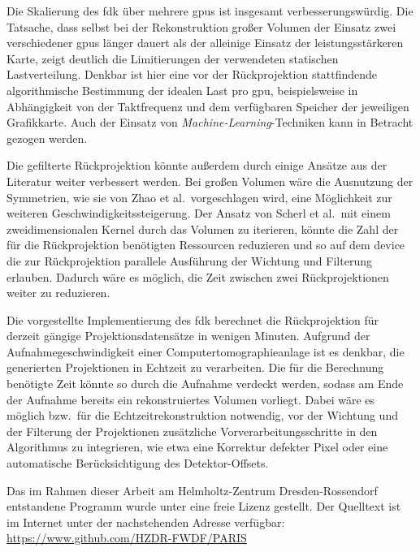 Die Skalierung des \gls{fdk} über mehrere \gls{gpu}s ist insgesamt verbesserungswürdig. Die Tatsache, dass selbst bei
der Rekonstruktion großer Volumen der Einsatz zwei verschiedener \gls{gpu}s länger dauert als der alleinige Einsatz der
leistungsstärkeren Karte, zeigt deutlich die Limitierungen der verwendeten statischen Lastverteilung. Denkbar ist hier
eine vor der Rückprojektion stattfindende algorithmische Bestimmung der idealen Last pro \gls{gpu}, beispielsweise in
Abhängigkeit von der Taktfrequenz und dem verfügbaren Speicher der jeweiligen Grafikkarte. Auch der Einsatz von
\textit{Machine-Learning}-Techniken kann in Betracht gezogen werden.

Die gefilterte Rückprojektion könnte außerdem durch einige Ansätze aus der Literatur weiter verbessert werden. Bei
großen Volumen wäre die Ausnutzung der Symmetrien, wie sie von Zhao et al.\ vorgeschlagen wird, eine Möglichkeit zur
weiteren Geschwindigkeitssteigerung. Der Ansatz von Scherl et al.\, mit einem zweidimensionalen Kernel durch das Volumen
zu iterieren, könnte die Zahl der für die Rückprojektion benötigten Ressourcen reduzieren und so auf dem \gls{device}
die zur Rückprojektion parallele Ausführung der Wichtung und Filterung erlauben. Dadurch wäre es möglich, die Zeit
zwischen zwei Rückprojektionen weiter zu reduzieren.

Die vorgestellte Implementierung des \gls{fdk} berechnet die Rückprojektion für derzeit gängige Projektionsdatensätze
in wenigen Minuten. Aufgrund der Aufnahmegeschwindigkeit einer Computertomographieanlage ist es denkbar, die
generierten Projektionen in Echtzeit zu verarbeiten. Die für die Berechnung benötigte Zeit könnte so durch die Aufnahme
verdeckt werden, sodass am Ende der Aufnahme bereits ein rekonstruiertes Volumen vorliegt. Dabei wäre es möglich bzw.\
für die Echtzeitrekonstruktion notwendig, vor der Wichtung und der Filterung der Projektionen zusätzliche
Vorverarbeitungsschritte in den Algorithmus zu integrieren, wie etwa eine Korrektur defekter Pixel oder eine
automatische Berücksichtigung des Detektor-Offsets.

Das im Rahmen dieser Arbeit am Helmholtz-Zentrum Dresden-Rossendorf entstandene Programm wurde unter eine freie Lizenz
gestellt. Der Quelltext ist im Internet unter der nachstehenden Adresse verfügbar:
\url{https://www.github.com/HZDR-FWDF/PARIS}
